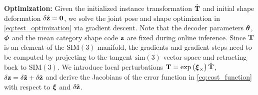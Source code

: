 
{\vspace{1ex}\bf \noindent Optimization: }%
Given the initialized instance transformation $\hat{\mathbf{T}}$ and initial shape deformation $\delta\hat{\mathbf{z}} = \mathbf{0}$, we solve the joint pose and shape optimization in \eqref{eq:test_optimization} via gradient descent. Note that the decoder parameters $\boldsymbol{\theta}$, $\boldsymbol{\phi}$ and the mean category shape code $\mathbf{z}$ are fixed during online inference. Since $\mathbf{T}$ is an element of the $\text{SIM}(3)$ manifold, the gradients and gradient steps need to be computed by projecting to the tangent $\text{sim}(3)$ vector space and retracting back to $\text{SIM}(3)$. We introduce local perturbations $\mathbf{T} = \exp\left(\boldsymbol{\xi}_\times\right) \hat{\mathbf{T}}$, $\delta\mathbf{z} = \delta\tilde{\mathbf{z}} + \delta\hat{\mathbf{z}}$ and derive the Jacobians of the error function in \eqref{eq:cost_function} with respect to $\boldsymbol{\xi}$ and $\delta\tilde{\mathbf{z}}$. 




